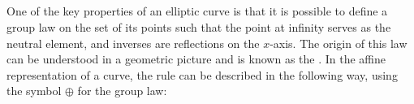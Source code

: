 \begin{comment}
Looking at the previous examples, the compression rate does not look very impressive. However, looking at the real-life example of the \curvename{secp256k1} curve shows that compression is has significant practical advantages.
\begin{example}
Consider the \curvename{secp256k1} curve from \examplename{} \ref{secp256k1} again. The following code uses Sage to generate a random affine curve point, then applies our compression method to it:
\begin{sagecommandline}
sage: P = secp256k1.random_point().xy()
sage: P
sage: # uncompressed affine point size
sage: ZZ(P[0]).nbits()+ZZ(P[1]).nbits()
sage: # compute the compression
sage: if P[1] > Fp(-1)/Fp(2):
....:     PARITY = 1
....: else:
....:     PARITY = 0
sage: PCOMPRESSED = [P[0],PARITY]
sage: PCOMPRESSED
sage: # compressed affine point size
sage: ZZ(PCOMPRESSED[0]).nbits()+ZZ(PCOMPRESSED[1]).nbits()
\end{sagecommandline}
\end{example}\sme{add explanation of how this shows what we claim}
\end{comment}

\subsection{}
\label{sec:affine_group_law}
One of the key properties of an elliptic curve is that it is possible to define a group law on the set of its points such that the point at infinity serves as the neutral element, and inverses are reflections on the $x$-axis. The origin of this law can be understood in a geometric picture and is known as the . In the affine representation of a  curve, the rule can be described in the following way, using the symbol $\oplus$ for the group law:

